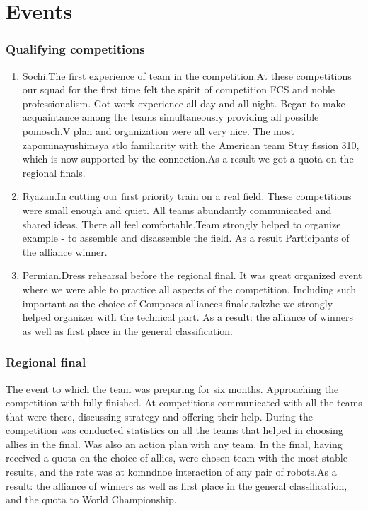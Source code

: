 \section{Events}
	\subsubsection{Qualifying competitions}
		\begin{enumerate}
			\item Sochi.The first experience of team in the competition.At these competitions our squad for the first time felt the spirit of competition FCS and noble professionalism. Got work experience all day and all night. Began to make acquaintance among the teams simultaneously providing all possible pomosch.V plan and organization were all very nice. The most zapominayushimsya stlo familiarity with the American team Stuy fission 310, which is now supported by the connection.As a result we got a quota on the regional finals.
			\\
			\item Ryazan.In cutting our first priority train on a real field. These competitions were small enough and quiet. All teams abundantly communicated and shared ideas. There all feel comfortable.Team strongly helped to organize example - to assemble and disassemble the field. As a result Participants of the alliance winner. 
			\\	
			\item Permian.Dress rehearsal before the regional final. It was great organized event where we were able to practice all aspects of the competition. Including such important as the choice of Composes alliances finale.takzhe we strongly helped organizer with the technical part. As a result: the alliance of winners as well as first place in the general classification.
			\\
		\end{enumerate}  
	\subsubsection{Regional final}	
		The event to which the team was preparing for six months. Approaching the competition with fully finished. At competitions communicated with all the teams that were there, discussing strategy and offering their help. During the competition was conducted statistics on all the teams that helped in choosing allies in the final. Was also an action plan with any team. In the final, having received a quota on the choice of allies, were chosen team with the most stable results, and the rate was at komndnoe interaction of any pair of robots.As a result: the alliance of winners as well as first place in the general classification, and the quota to World Championship.
			\\
	\newpage			

